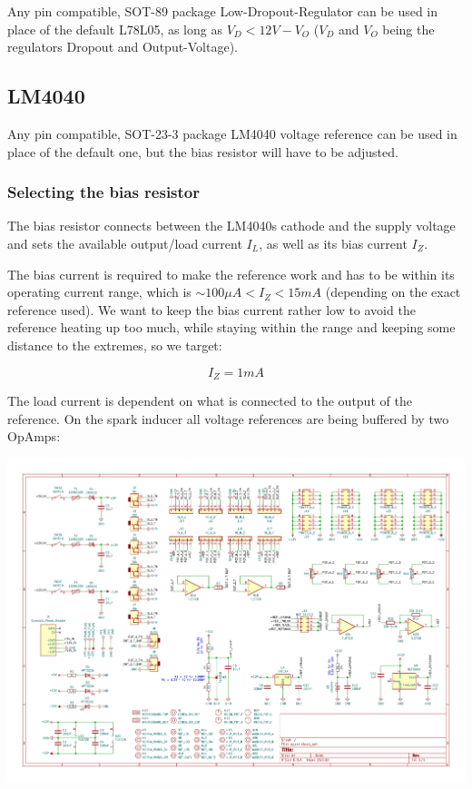 \documentclass[12pt, a4paper]{article}
\begin{document}
Any pin compatible, SOT-89 package Low-Dropout-Regulator can be used in place of the
default L78L05, as long as \enspace $V_D < 12V - V_O$ \enspace ($V_D$ and $V_O$ being the
regulators Dropout and Output-Voltage).

\subsection*{LM4040}

Any pin compatible, SOT-23-3 package LM4040 voltage reference can be used in place of the
default one, but the bias resistor will have to be adjusted.

\subsubsection*{Selecting the bias resistor}
\label{ssec:appendix_lm4040_selecting_bias_resistor}

The bias resistor connects between the LM4040s cathode and the supply voltage and sets the
available output/load current $I_L$, as well as its bias current $I_Z$.

The bias current is required to make the reference work and has to be within its operating
current range, which is \enspace $\sim \!\! 100\mu A < I_Z < 15mA $ \enspace
(depending on the exact reference used). We want to keep the bias current rather low to avoid
the reference heating up too much, while staying within the range and keeping some distance to
the extremes, so we target:

\[ I_Z = 1mA \tag*{$(a)$}\label{tag:a} \]

The load current is dependent on what is connected to the output of the reference. On the
spark inducer all voltage references are being buffered by two OpAmps:

\includegraphics[width=\textwidth, trim = 16.7cm 8.9cm 1.5cm 9.1cm, clip=true]{pdf/schematic.pdf}
\end{document}

